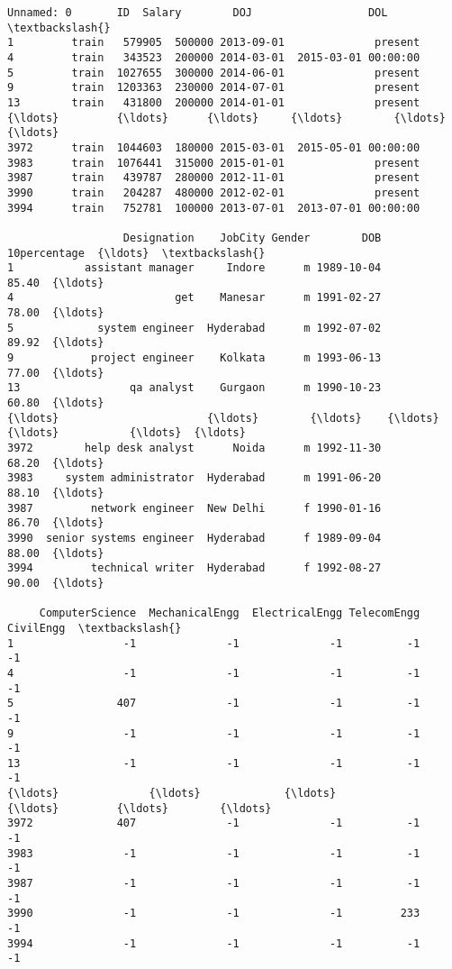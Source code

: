 \documentclass[11pt]{article}
\makeatletter
\newcommand{\boxspacing}{\kern\kvtcb@left@rule\kern\kvtcb@boxsep}
\newcommand{\prompt}[4]{
        \ttfamily\llap{{\color{#2}[#3]:\hspace{3pt}#4}}\vspace{-\baselineskip}
    }
\makeatother
\begin{document}
            \begin{tcolorbox}[breakable, size=fbox, boxrule=.5pt, pad at break*=1mm, opacityfill=0]
\prompt{Out}{outcolor}{41}{\boxspacing}
\begin{Verbatim}[commandchars=\\\{\}]
     Unnamed: 0       ID  Salary        DOJ                  DOL  \textbackslash{}
1         train   579905  500000 2013-09-01              present
4         train   343523  200000 2014-03-01  2015-03-01 00:00:00
5         train  1027655  300000 2014-06-01              present
9         train  1203363  230000 2014-07-01              present
13        train   431800  200000 2014-01-01              present
{\ldots}         {\ldots}      {\ldots}     {\ldots}        {\ldots}                  {\ldots}
3972      train  1044603  180000 2015-03-01  2015-05-01 00:00:00
3983      train  1076441  315000 2015-01-01              present
3987      train   439787  280000 2012-11-01              present
3990      train   204287  480000 2012-02-01              present
3994      train   752781  100000 2013-07-01  2013-07-01 00:00:00

                  Designation    JobCity Gender        DOB  10percentage  {\ldots}  \textbackslash{}
1           assistant manager     Indore      m 1989-10-04         85.40  {\ldots}
4                         get    Manesar      m 1991-02-27         78.00  {\ldots}
5             system engineer  Hyderabad      m 1992-07-02         89.92  {\ldots}
9            project engineer    Kolkata      m 1993-06-13         77.00  {\ldots}
13                 qa analyst    Gurgaon      m 1990-10-23         60.80  {\ldots}
{\ldots}                       {\ldots}        {\ldots}    {\ldots}        {\ldots}           {\ldots}  {\ldots}
3972        help desk analyst      Noida      m 1992-11-30         68.20  {\ldots}
3983     system administrator  Hyderabad      m 1991-06-20         88.10  {\ldots}
3987         network engineer  New Delhi      f 1990-01-16         86.70  {\ldots}
3990  senior systems engineer  Hyderabad      f 1989-09-04         88.00  {\ldots}
3994         technical writer  Hyderabad      f 1992-08-27         90.00  {\ldots}

     ComputerScience  MechanicalEngg  ElectricalEngg TelecomEngg  CivilEngg  \textbackslash{}
1                 -1              -1              -1          -1         -1
4                 -1              -1              -1          -1         -1
5                407              -1              -1          -1         -1
9                 -1              -1              -1          -1         -1
13                -1              -1              -1          -1         -1
{\ldots}              {\ldots}             {\ldots}             {\ldots}         {\ldots}        {\ldots}
3972             407              -1              -1          -1         -1
3983              -1              -1              -1          -1         -1
3987              -1              -1              -1          -1         -1
3990              -1              -1              -1         233         -1
3994              -1              -1              -1          -1         -1


\end{Verbatim}
\end{tcolorbox}
\end{document}
